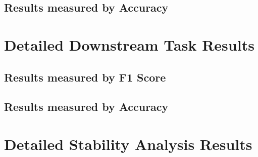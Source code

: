 

\subsection{Results measured by Accuracy}




\section{Detailed Downstream Task Results}
\label{sec:appendix_downstream}

\subsection{Results measured by F1 Score}







\newpage

\subsection{Results measured by Accuracy}





\section{Detailed Stability Analysis Results}
\label{sec:appendix_stability_analysis}

